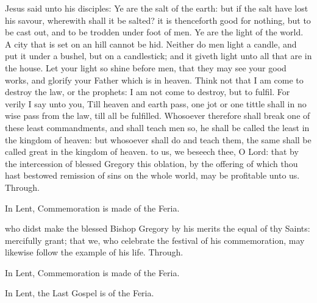  Jesus said unto his disciples: Ye are the salt of the earth: but if the salt have lost his savour, wherewith shall it be salted? it is thenceforth good for nothing, but to be cast out, and to be trodden under foot of men. Ye are the light of the world. A city that is set on an hill cannot be hid. Neither do men light a candle, and put it under a bushel, but on a candlestick; and it giveth light unto all that are in the house. Let your light so shine before men, that they may see your good works, and glorify your Father which is in heaven. Think not that I am come to destroy the law, or the prophets: I am not come to destroy, but to fulfil. For verily I say unto you, Till heaven and earth pass, one jot or one tittle shall in no wise pass from the law, till all be fulfilled. Whosoever therefore shall break one of these least commandments, and shall teach men so, he shall be called the least in the kingdom of heaven: but whosoever shall do and teach them, the same shall be called great in the kingdom of heaven.
\secret
{} to us, we beseech thee, O Lord: that by the intercession of blessed Gregory this oblation, by the offering of which thou hast bestowed remission of sins on the whole world, may be profitable unto us. Through.
\begin{rubric}
    In Lent, Commemoration is made of the Feria.%
\end{rubric}
\postcommunion
{} who didst make the blessed Bishop Gregory by his merits the equal of thy Saints: mercifully grant; that we, who celebrate the festival of his commemoration, may likewise follow the example of his life. Through.
\begin{rubric}
    In Lent, Commemoration is made of the Feria.%
\end{rubric}
\begin{rubric}
    In Lent, the Last Gospel is of the Feria.
\end{rubric}


